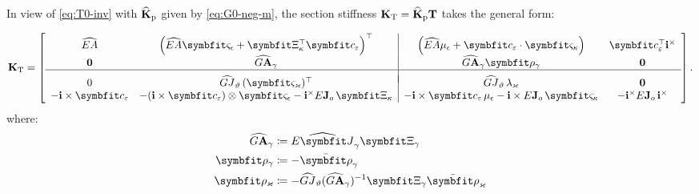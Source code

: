 In view of \eqref{eq:T0-inv} with \(\widehat{\mathbf{K}}_{\rm p}\) given by \eqref{eq:G0-neg-m}, the section stiffness \(\mathbf{K}_{\rm T}=\widehat{\mathbf{K}}_{\rm p}\mathbf{T}\) takes the general form:

\begin{equation}
\TraceStiffNM 
=
\left[\begin{array}{cc|cc}
\AxialRigidity
& \left(\AxialRigidity\ShiftN 
+ \ShiftA^{\top}\AxialCoupling\right)^{\top} 
& \left(\AxialRigidity\ShiftScaleN + \AxialCoupling\cdot \ShiftF\right) 
& \AxialCoupling^\top\FrameBasis^\times
\\[2pt]
\mathbf{0} &
\TraceShearRigidity &
\TraceShearRigidity\TraceShearOrigin &
\mathbf{0}
\\ \hline &&& \\[-7pt] 
0 &
\TwistRigidity\,(\ShiftT)^\top
& \TwistRigidity\,\ShiftScaleT &
\mathbf{0}
\\ %
-\FrameBasis\times\AxialCoupling 
& -(\FrameBasis\times\AxialCoupling)\otimes\ShiftN
  -\FrameBasis^\times E\IntRoR\,\ShiftA 
&
 -\FrameBasis\times\AxialCoupling\,\ShiftScaleN
 -\FrameBasis\times E\IntRoR\,\ShiftF
&
- \FrameBasis^\times E\IntRoR\,\FrameBasis^\times
\end{array}\right].
\label{eq:C-C1}
\end{equation}
where:
\begin{align}
\TraceShearRigidity &\coloneq \ShearRigidity \ShiftB \\
\TraceShearOrigin &\coloneq-\TraceFT \\
\TraceTwistOrigin &\coloneq-\TwistRigidity (\TraceShearRigidity)^{-1}\ShiftB\TraceTF
\end{align}
